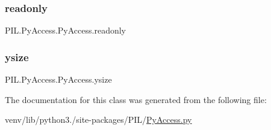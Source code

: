 \subsubsection{\texorpdfstring{readonly}{readonly}}
{\footnotesize\ttfamily P\+I\+L.\+Py\+Access.\+Py\+Access.\+readonly}

\mbox{\label{classPIL_1_1PyAccess_1_1PyAccess_a6e69035132ffbd03e1bd5ed58c64a29f}} 
\subsubsection{\texorpdfstring{ysize}{ysize}}
{\footnotesize\ttfamily P\+I\+L.\+Py\+Access.\+Py\+Access.\+ysize}



The documentation for this class was generated from the following file\+:\begin{DoxyCompactItemize}
\item 
venv/lib/python3./site-\/packages/\+P\+I\+L/\hyperlink{PyAccess_8py}{Py\+Access.\+py}\end{DoxyCompactItemize}

